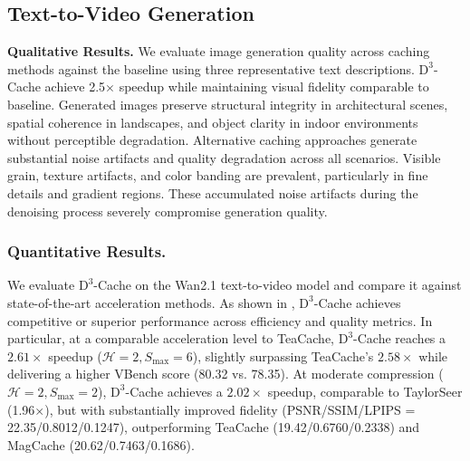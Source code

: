 \subsection{Text-to-Video Generation}\label{sec:results:text_to_video_generation}

\textbf{Qualitative Results.}
We evaluate image generation quality
across caching methods
against the baseline
using three representative text descriptions.
$\mathrm{D}^3$-Cache
achieve 2.5$\times$ speedup
while maintaining visual fidelity
comparable to baseline.
Generated images
preserve structural integrity
in architectural scenes,
spatial coherence in landscapes,
and object clarity
in indoor environments
without perceptible degradation.
Alternative caching approaches
generate substantial noise artifacts
and quality degradation
across all scenarios.
Visible grain, texture artifacts, and color banding
are prevalent,
particularly in fine details and gradient regions.
These accumulated noise artifacts
during the denoising process
severely compromise generation quality.

\subsubsection{Quantitative Results.}
We evaluate $\mathrm{D}^3$-Cache on the Wan2.1 text-to-video model
and compare it against state-of-the-art acceleration methods.
As shown in ,
$\mathrm{D}^3$-Cache achieves competitive or superior performance
across efficiency and quality metrics.
In particular, at a comparable acceleration level to TeaCache,
$\mathrm{D}^3$-Cache reaches a $2.61\times$ speedup (\(\mathcal{H}{=}2,S_{\mathrm{max}}{=}6\)),
slightly surpassing TeaCache's $2.58\times$ while delivering a higher VBench score (80.32 vs. 78.35).
At moderate compression (\(\mathcal{H}{=}2,S_{\mathrm{max}}{=}2\)),
$\mathrm{D}^3$-Cache achieves a $2.02\times$ speedup, comparable to TaylorSeer (1.96$\times$),
but with substantially improved fidelity (PSNR/SSIM/LPIPS = 22.35/0.8012/0.1247),
outperforming TeaCache (19.42/0.6760/0.2338) and MagCache (20.62/0.7463/0.1686).
